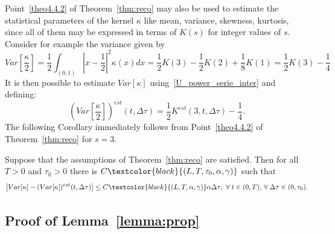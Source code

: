 \documentclass[AHL,Unicode,longabstracts,published]{cedram}
\newcommand*\dst{\displaystyle}
\newcommand{\MT}[1]{\textcolor{black}{#1}}
\let\oldforall\forall
\renewcommand*{\forall}{\mathrel{\oldforall}}
\begin{document}
Point~\eqref{theo4.4.2} of Theorem~\ref{thm:reco} may also be used to estimate the statistical parameters of the kernel $\kappa $ like mean, variance, skewness, kurtosis, since all of them may be expressed in terms of $K(s)$ for integer values of $s$. Consider for example the variance given by
\begin{equation*}
Var\left[\dfrac{\kappa}{2}\right] =\dfrac{1}{2} \dst\int_{(0,1)} \left| x-\dfrac{1}{2}\right|^2 \kappa(x)dx =\dfrac{1}{2}K(3)- \dfrac{1}{2}K(2)+ \dfrac{1}{8}K(1)=\dfrac{1}{2}K(3)- \dfrac{1}{4}
\end{equation*}
It is then possible to estimate $Var[\kappa]$ using~\ref{U_power_serie_inter} and defining:
\begin{equation*}
\left(Var\left[\dfrac{\kappa}{2}\right] \right)^{est}(t, \Delta \tau)=\dfrac{1}{2}K^{est}(3, t, \Delta \tau)- \dfrac{1}{4}.
\end{equation*}
The following Corollary immediately follows from Point~\eqref{theo4.4.2} of Theorem~\ref{thm:reco} for $s=3$.


\begin{coro}\label{cor:variance}
Suppose that the assumptions of Theorem~\ref{thm:reco} are satisfied. Then for all $T>0$ and $\tau _0>0$ there is $C\MT{(L,T, \tau _0,\alpha, \gamma)}$ such that
\begin{equation*}
\left| Var[\kappa]-(Var[\kappa])^{est}(t, \Delta \tau)\right| \leq C\MT{(L,T,\alpha, \gamma)}\alpha \Delta \tau,\,\,\forall t\in (0, T),\,\forall \Delta \tau \in (0, \tau _0).
\end{equation*}
\end{coro}


\subsection{Proof of Lemma~\ref{lemma:prop}}
\end{document}
